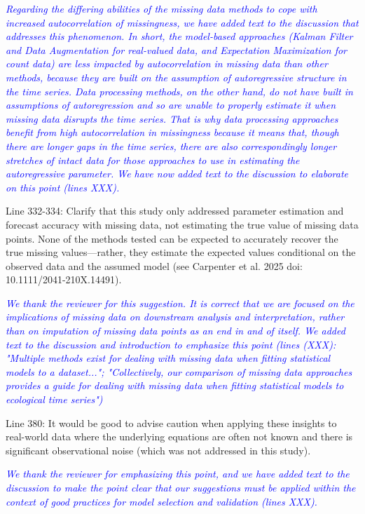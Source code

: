 \documentclass{article}
\begin{document}
\begin{linenumbers}
\noindent \textcolor{blue}{\textit{Regarding the differing abilities of the missing data methods to cope with increased autocorrelation of missingness, we have added text to the discussion that addresses this phenomenon. In short, the model-based approaches (Kalman Filter and Data Augmentation for real-valued data, and Expectation Maximization for count data) are less impacted by autocorrelation in missing data than other methods, because they are built on the assumption of autoregressive structure in the time series. Data processing methods, on the other hand, do not have built in assumptions of autoregression and so are unable to properly estimate it when missing data disrupts the time series. That is why data processing approaches benefit from high autocorrelation in missingness because it means that, though there are longer gaps in the time series, there are also correspondingly longer stretches of intact data for those approaches to use in estimating the autoregressive parameter. We have now added text to the discussion to elaborate on this point (lines XXX).}}

\bigskip 

Line 332-334: Clarify that this study only addressed parameter estimation and forecast accuracy with missing data, not estimating the true value of missing data points. None of the methods tested can be expected to accurately recover the true missing values—rather, they estimate the expected values conditional on the observed data and the assumed model (see Carpenter et al. 2025 doi: 10.1111/2041-210X.14491).

\noindent \textcolor{blue}{\textit{We thank the reviewer for this suggestion. It is correct that we are focused on the implications of missing data on downstream analysis and interpretation, rather than on imputation of missing data points as an end in and of itself. We added text to the discussion and introduction to emphasize this point (lines (XXX): "Multiple methods exist for dealing with missing data when fitting statistical models to a dataset..."; "Collectively, our comparison of missing data approaches provides a guide for dealing with missing data when fitting statistical models to ecological time series")}} 

Line 380: It would be good to advise caution when applying these insights to real-world data where the underlying equations are often not known and there is significant observational noise (which was not addressed in this study).

\noindent \textcolor{blue}{\textit{We thank the reviewer for emphasizing this point, and we have added text to the discussion to make the point clear that our suggestions must be applied within the context of good practices for model selection and validation (lines XXX).}}


\end{linenumbers}
\end{document}
